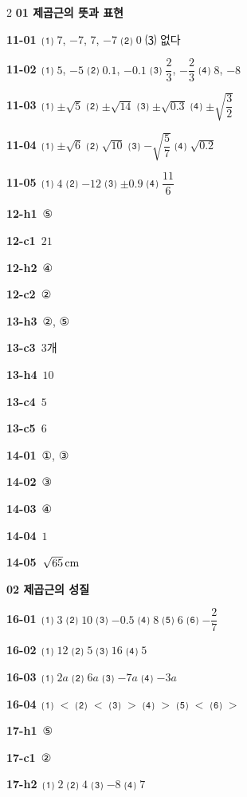 \documentclass[10pt,a4paper]{article}
\begin{document}
\begin{multicols}{2}\small
\noindent\textbf{01 제곱근의 뜻과 표현}\par\smallskip
\noindent\textbf{11-01}\ ⑴ $7$, $-7$, $7$, $-7$ ⑵ $0$ ⑶ 없다\par
\noindent\textbf{11-02}\ ⑴ $5$, $-5$ ⑵ $0.1$, $-0.1$ ⑶ $\dfrac{2}{3}$, $-\dfrac{2}{3}$ ⑷ $8$, $-8$\par
\noindent\textbf{11-03}\ ⑴ $\pm\sqrt{5}$ ⑵ $\pm\sqrt{14}$ ⑶ $\pm\sqrt{0.3}$ ⑷ $\pm\sqrt{\dfrac{3}{2}}$\par
\noindent\textbf{11-04}\ ⑴ $\pm\sqrt{6}$ ⑵ $\sqrt{10}$ ⑶ $-\sqrt{\dfrac{5}{7}}$ ⑷ $\sqrt{0.2}$\par
\noindent\textbf{11-05}\ ⑴ $4$ ⑵ $-12$ ⑶ $\pm 0.9$ ⑷ $\dfrac{11}{6}$\par
\noindent\textbf{12-h1}\ ⑤\par
\noindent\textbf{12-c1}\ $21$\par
\noindent\textbf{12-h2}\ ④\par
\noindent\textbf{12-c2}\ ②\par
\noindent\textbf{13-h3}\ ②, ⑤\par
\noindent\textbf{13-c3}\ $3$개\par
\noindent\textbf{13-h4}\ $10$\par
\noindent\textbf{13-c4}\ $5$\par
\noindent\textbf{13-c5}\ $6$\par
\noindent\textbf{14-01}\ ①, ③\par
\noindent\textbf{14-02}\ ③\par
\noindent\textbf{14-03}\ ④\par
\noindent\textbf{14-04}\ $1$\par
\noindent\textbf{14-05}\ $\sqrt{65}\mkern3mu \mathrm{cm}$\par
\noindent\textbf{02 제곱근의 성질}\par\smallskip
\noindent\textbf{16-01}\ ⑴ $3$ ⑵ $10$ ⑶ $-0.5$ ⑷ $8$ ⑸ $6$ ⑹ $-\dfrac{2}{7}$\par
\noindent\textbf{16-02}\ ⑴ $12$ ⑵ $5$ ⑶ $16$ ⑷ $5$\par
\noindent\textbf{16-03}\ ⑴ $2a$ ⑵ $6a$ ⑶ $-7a$ ⑷ $-3a$\par
\noindent\textbf{16-04}\ ⑴ $<$ ⑵ $<$ ⑶ $>$ ⑷ $>$ ⑸ $<$ ⑹ $>$\par
\noindent\textbf{17-h1}\ ⑤\par
\noindent\textbf{17-c1}\ ②\par
\noindent\textbf{17-h2}\ ⑴ $2$ ⑵ $4$ ⑶ $-8$ ⑷ $7$\par

\end{multicols}
\end{document}
